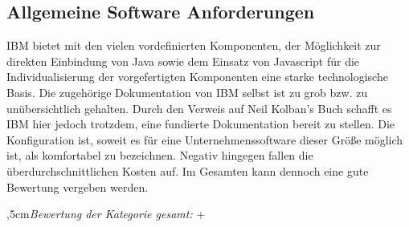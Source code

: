 
\subsection{Allgemeine Software Anforderungen}

IBM bietet mit den vielen vordefinierten Komponenten, der Möglichkeit zur direkten Einbindung von Java sowie dem Einsatz von Javascript für die Individualisierung der vorgefertigten Komponenten eine starke technologische Basis. Die zugehörige Dokumentation von IBM selbst ist zu grob bzw. zu unübersichtlich gehalten. Durch den Verweis auf Neil Kolban's Buch schafft es IBM hier jedoch trotzdem, eine fundierte Dokumentation bereit zu stellen. 
Die Konfiguration ist, soweit es für eine Unternehmenssoftware dieser Größe möglich ist, als komfortabel zu bezeichnen.
Negativ hingegen fallen die überdurchschnittlichen Kosten auf. Im Gesamten kann dennoch eine gute Bewertung vergeben werden.

\bigskip{},5cm\textit{Bewertung der Kategorie gesamt:} \hspace{5mm} \textcircled{+}
\leftskip=0cm

